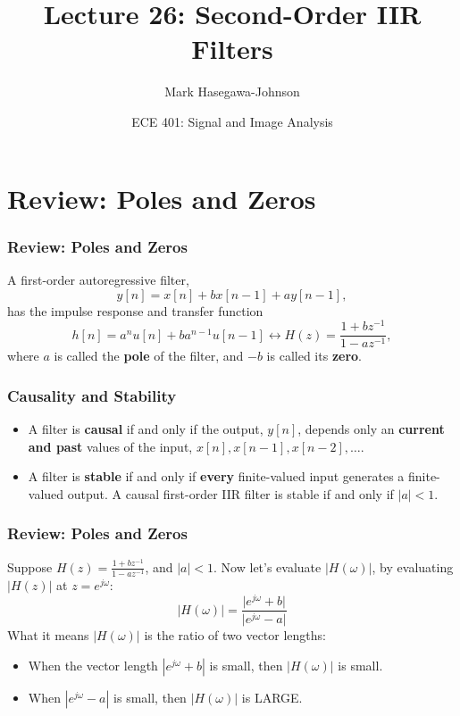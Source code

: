 \documentclass{beamer}
\title{Lecture 26: Second-Order IIR Filters}
\author{Mark Hasegawa-Johnson}
\date{ECE 401: Signal and Image Analysis}
\begin{document}
\begin{frame}
  \maketitle
\end{frame}

\begin{frame}
  \tableofcontents
\end{frame}

\section[Review]{Review: Poles and Zeros}
\setcounter{subsection}{1}

\begin{frame}
  \frametitle{Review: Poles and Zeros}
  A first-order autoregressive filter,
  \[
  y[n] = x[n]+bx[n-1]+ay[n-1],
  \]
  has the impulse response and transfer function
  \[
  h[n]=a^n u[n]+ba^{n-1}u[n-1] \leftrightarrow H(z)  = \frac{1+bz^{-1}}{1-az^{-1}},
  \]
  where $a$ is called the {\bf pole} of the filter, and $-b$ is called
  its {\bf zero}.
\end{frame}

\begin{frame}
  \frametitle{Causality and Stability}
  \begin{itemize}
  \item A filter is {\bf causal} if and only if the output, $y[n]$,
    depends only an {\bf current and past} values of the input, $x[n],
    x[n-1],x[n-2],\ldots$.
  \item A filter is {\bf stable} if and only if {\bf every}
    finite-valued input generates a finite-valued output.  A causal
    first-order IIR filter is stable if and only if $|a|<1$.
  \end{itemize}
\end{frame}

\begin{frame}
  \frametitle{Review: Poles and Zeros}

  Suppose $H(z)=\frac{1+bz^{-1}}{1-az^{-1}}$, and $|a|<1$.  Now let's
  evaluate $|H(\omega)|$, by evaluating $|H(z)|$ at $z=e^{j\omega}$:
  \[
  \vert H(\omega)\vert = 
  \frac{\vert e^{j\omega}+b\vert}{\vert e^{j\omega}-a\vert}
  \]
  What it means $|H(\omega)|$ is the ratio of two vector lengths:
  \begin{itemize}
  \item When the vector length $|e^{j\omega}+b|$ is small, then
    $|H(\omega)|$ is small.
  \item When $|e^{j\omega}-a|$ is small, then $|H(\omega)|$ is LARGE.
  \end{itemize}
\end{frame}
\end{document}
